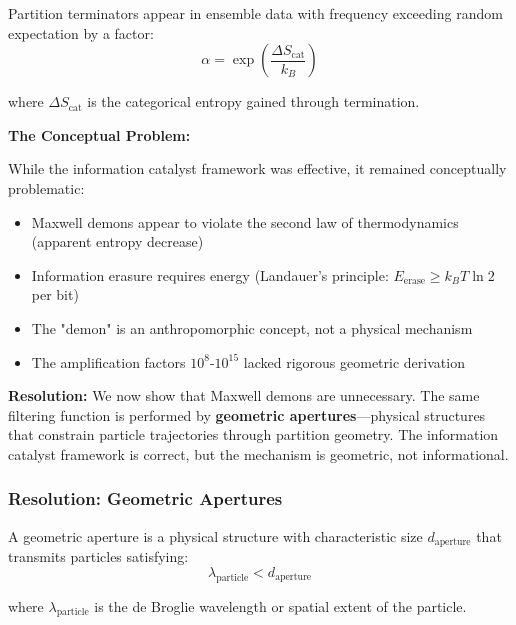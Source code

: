 \begin{theorem}
\label{thm:terminator_enhancement}
Partition terminators appear in ensemble data with frequency exceeding random expectation by a factor:
\begin{equation}
\alpha = \exp\left(\frac{\Delta S_{\text{cat}}}{k_B}\right)
\end{equation}

where $\Delta S_{\text{cat}}$ is the categorical entropy gained through termination.
\end{theorem}

\textbf{The Conceptual Problem:}

While the information catalyst framework was effective, it remained conceptually problematic:
\begin{itemize}
    \item Maxwell demons appear to violate the second law of thermodynamics (apparent entropy decrease)
    \item Information erasure requires energy (Landauer's principle: $E_{\text{erase}} \geq k_B T \ln 2$ per bit)
    \item The "demon" is an anthropomorphic concept, not a physical mechanism
    \item The amplification factors $10^8$-$10^{15}$ lacked rigorous geometric derivation
\end{itemize}

\textbf{Resolution:} We now show that Maxwell demons are unnecessary. The same filtering function is performed by \textbf{geometric apertures}—physical structures that constrain particle trajectories through partition geometry. The information catalyst framework is correct, but the mechanism is geometric, not informational.

\subsubsection{Resolution: Geometric Apertures}

\begin{definition}
\label{def:geometric_aperture}
A geometric aperture is a physical structure with characteristic size $d_{\text{aperture}}$ that transmits particles satisfying:
\begin{equation}
\lambda_{\text{particle}} < d_{\text{aperture}}
\end{equation}

where $\lambda_{\text{particle}}$ is the de Broglie wavelength or spatial extent of the particle.
\end{definition}

